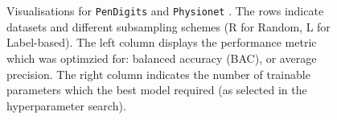 \documentclass{article}
\begin{document}
\begin{figure}
   \\%
  \\ %
  \caption{%
    Visualisations for \texttt{PenDigits} and \texttt{Physionet} . The rows indicate datasets and different subsampling schemes (R for Random, L for Label-based). The left column displays the performance metric which was optimzied for: balanced accuracy (BAC), or average precision. The right column indicates the number of trainable parameters which the best model required (as selected in the hyperparameter search).
  }
  \label{supp: barplots2}
\end{figure}
\end{document}
